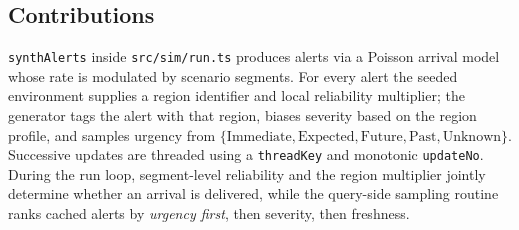 \subsection{Contributions}
\texttt{synthAlerts} inside \texttt{src/sim/run.ts} produces alerts via a Poisson arrival model whose rate is modulated by scenario segments. For every alert the seeded environment supplies a region identifier and local reliability multiplier; the generator tags the alert with that region, biases severity based on the region profile, and samples urgency from $\{\text{Immediate},\text{Expected},\text{Future},\text{Past},\text{Unknown}\}$. Successive updates are threaded using a \texttt{threadKey} and monotonic \texttt{updateNo}. During the run loop, segment-level reliability and the region multiplier jointly determine whether an arrival is delivered, while the query-side sampling routine ranks cached alerts by \emph{urgency first}, then severity, then freshness.

